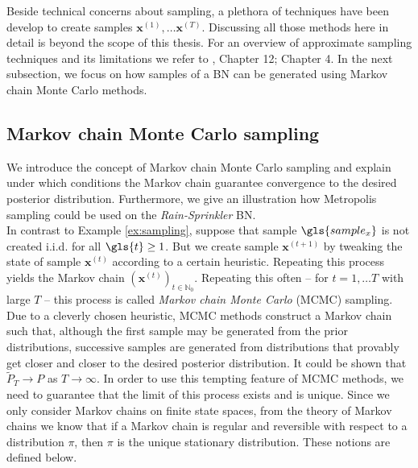 \documentclass[a4paper, twoside, 11pt]{report}
\newcommand{\bfx}{{\mathbf{x}}}
\theoremstyle{plain}
\theoremstyle{definition}
\theoremstyle{remark}
\def\N{{\mathbb N}}
\begin{document}
Beside technical concerns about sampling, a plethora of techniques have been develop to create samples $\bfx^{(1)}, \ldots \bfx^{(T)}$. Discussing all those methods here in detail is beyond the scope of this thesis. For an overview of approximate sampling techniques and its limitations we refer to \cite{koller2009probabilistic}, Chapter 12; \cite{nielsen2009bayesian} Chapter 4. In the next subsection, we focus on how samples of a BN can be generated using Markov chain Monte Carlo methods. 

\subsection{Markov chain Monte Carlo sampling}\label{sec:mcmc}
We introduce the concept of Markov chain Monte Carlo sampling and explain under which conditions the Markov chain guarantee convergence to the desired posterior distribution. Furthermore, we give an illustration how Metropolis sampling could be used on the \textit{Rain-Sprinkler} BN. \\

In contrast to Example \ref{ex:sampling}, suppose that sample $\gls{sample_x}$ is not created i.i.d. for all $\gls{t} \geq 1$. But we create sample $\bfx^{(t+1)}$ by tweaking the state of sample $\bfx^{(t)}$ according to a certain heuristic. Repeating this process yields the Markov chain $(\bfx^{(t)})_{t \in \N_0}$. Repeating this often -- for $t = 1, \ldots T$ with large $T$  -- this process is called \textit{Markov chain Monte Carlo} (MCMC) sampling. 
Due to a cleverly chosen heuristic, MCMC methods construct a Markov chain such that, although the first sample may be generated from the prior distributions, successive samples are generated from distributions that provably get closer and closer to the desired posterior distribution. It could be shown \citep[p.~517]{koller2009probabilistic} that $\widetilde{P}_T \to P$ as $T \to \infty$. In order to use this tempting feature of MCMC methods, we need to guarantee that the limit of this process exists and is unique. Since we only consider Markov chains on finite state spaces, from the theory of Markov chains we know that if a Markov chain is regular and reversible with respect to a distribution $\pi$, then $\pi$ is the unique stationary distribution. These notions are defined below.


\end{document}
